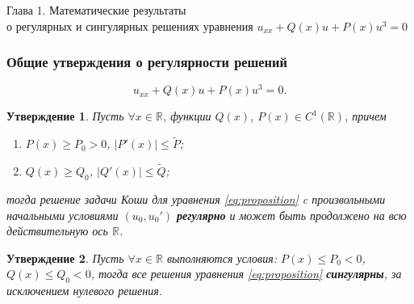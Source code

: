 \documentclass [10pt] {beamer}
\newtheorem{proposition}{Утверждение}
\begin{document}
\begin{frame}
	\begin{center}
		\LARGE Глава 1. Математические результаты \\ о регулярных и сингулярных решениях уравнения $u_{xx} + Q(x) u + P(x) u^3 = 0$
	\end{center}
\end{frame}

\begin{frame}
	\frametitle{Общие утверждения о регулярности решений}

	\begin{equation}
		u_{xx} + Q(x) u + P(x) u^3 = 0.
		\label{eq:proposition}
	\end{equation}

	\begin{proposition}
		Пусть $\forall x \in \mathbb{R}$, функции $Q(x)$, $P(x) \in C^1(\mathbb{R})$, причем
		\begin{enumerate}
			\item[(а)] $P(x) \ge P_0 > 0$, $|P'(x)| \le \widetilde{P}$;
			\item[(б)] $Q(x) \ge Q_0$, $|Q'(x)| \le \widetilde{Q}$;
		\end{enumerate}
		тогда решение задачи Коши для уравнения \eqref{eq:proposition} c произвольными начальными условиями $(u_0, u_0')$ {\bf регулярно} и может быть продолжено на всю действительную ось $\mathbb{R}$.
		\label{prop:regular}
	\end{proposition}

	\medskip
	
	\begin{proposition}
		Пусть $\forall x \in \mathbb{R}$ выполняются условия: $P(x) \le P_0 < 0$, $Q(x) \le Q_0 < 0$, тогда все решения уравнения \eqref{eq:proposition} {\bf сингулярны}, за исключением нулевого решения.
		\label{prop:singular}
	\end{proposition}
	
\end{frame}
\end{document}
